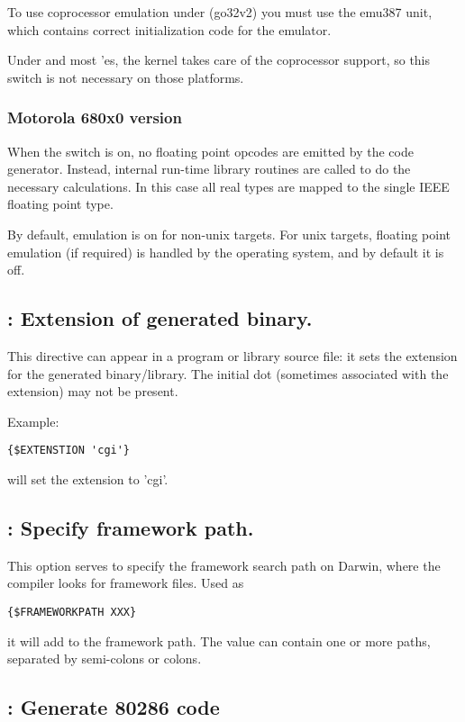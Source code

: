 To use coprocessor emulation under \dos (go32v2) you must use the
emu387 unit, which contains correct initialization code for the
emulator.

Under \linux and most \unix'es, the kernel takes care of the
coprocessor support, so this switch is not necessary on those platforms.

\subsubsection{Motorola 680x0 version}

When the switch is on, no floating point opcodes are emitted
by the code generator. Instead, internal run-time library routines
are called to do the necessary calculations. In this case all
real types are mapped to the single IEEE floating point type.

\begin{remark}By default, emulation is on for non-unix targets. 
For unix targets, floating point emulation (if required) is handled
by the operating system, and by default it is off.
\end{remark}
\subsection{ : Extension of generated binary.}
This directive can appear in a program or library source file: it sets the
extension for the generated binary/library. The initial dot (sometimes
associated with the extension) may not be present.

Example:
\begin{verbatim}
{$EXTENSTION 'cgi'}
\end{verbatim}
will set the extension to 'cgi'.

\subsection{ : Specify framework path.}
This option serves to specify the framework search path on Darwin, 
where the compiler looks for framework files. Used as
\begin{verbatim}  
{$FRAMEWORKPATH XXX}
\end{verbatim}
it will add  to the framework path. The value  can contain
one or more paths, separated by semi-colons or colons.


\subsection{ : Generate 80286 code}

